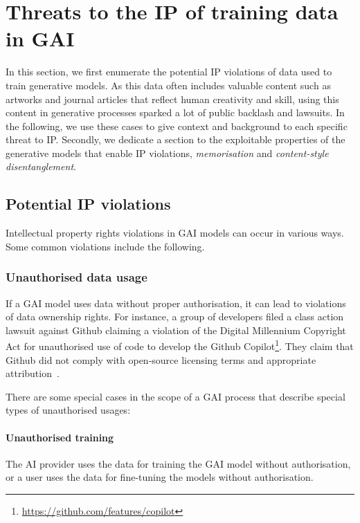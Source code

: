 \documentclass[conference,table]{IEEEtran}
\begin{document}
\section{Threats to the IP of training data in GAI}\label{sec:IPR-threats}
In this section, we first enumerate the potential IP violations of data used to train generative models. 
As this data often includes valuable content such as artworks and journal articles that reflect human creativity and skill, using this content in generative processes sparked a lot of public backlash and lawsuits. In the following, we use these cases to give context and background to each specific threat to IP. 
Secondly, we dedicate a section to the exploitable properties of the generative models that enable IP violations, \textit{memorisation} and \textit{content-style disentanglement}.

\subsection{Potential IP violations}
Intellectual property rights violations in GAI models can occur in various ways. Some common violations include the following.

\subsubsection{Unauthorised data usage}
If a GAI model uses data without proper authorisation, it can lead to violations of data ownership rights. For instance, a group of developers filed a class action lawsuit against Github claiming a violation of the Digital Millennium Copyright Act for unauthorised use of code to develop the Github Copilot\footnote{\url{https://github.com/features/copilot}}. They claim that Github did not comply with open-source licensing terms and appropriate attribution~\cite{losio_first_2022}.

There are some special cases in the scope of a GAI process that describe special types of unauthorised usages:
        \paragraph{Unauthorised training} The AI provider uses the data for training the GAI model without authorisation, or a user uses the data for fine-tuning the models without authorisation.
\end{document}
